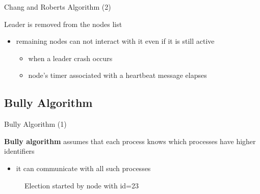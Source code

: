 \documentclass{beamer}
\begin{document}
        \begin{frame}{Chang and Roberts Algorithm (2)}
            
        Leader is removed from the nodes list
        \begin{itemize}
            \item remaining nodes can not interact with it even if it is still active
        \begin{itemize}
            \item[\ding{113}] when a leader crash occurs
            \item[\ding{113}] node's timer associated with a heartbeat message elapses
        \end{itemize}
        
        \end{itemize}
        
	 \end{frame}
	   
	 \subsection{Bully Algorithm}
	 
	 \begin{frame}{Bully Algorithm (1)}
	 
	 \textbf{Bully algorithm} assumes that each process knows which processes have higher identifiers
	 \begin{itemize}
	     \item it can communicate with all such processes
	 \end{itemize}
	 
	 \begin{figure}
          \centering
          
          \caption{Election started by node with id=23}
        \end{figure}
        \end{frame}
        
\end{document}
